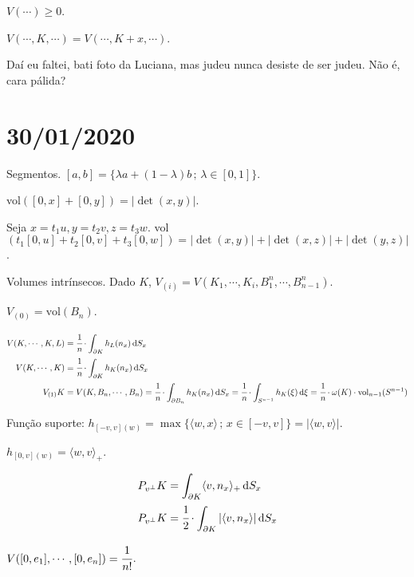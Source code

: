 \documentclass[12pt]{article}
\begin{document}
$V(\cdots) \ge 0$.

$V(\cdots, K, \cdots) = V(\cdots, K + x, \cdots)$.

Da\'i eu faltei, bati foto da Luciana, mas judeu nunca desiste de ser judeu. N\~ao \'e, cara p\'alida?

\vspace{100mm}

\section{30/01/2020}

\begin{flushright}
\end{flushright}

Segmentos. $[a, b] = \{ \lambda a + (1 - \lambda) b\,;\,\lambda \in [0,1] \}$.

vol$([0, x] + [0, y]) = | \det(x, y)|$.

Seja $x = t_1u, y = t_2v, z = t_3w$. vol$(t_1 [0, u] + t_2 [0, v] + t_3 [0, w]) = | \det(x, y)| + | \det(x, z)| + | \det(y, z)|$.

Volumes intr\'insecos. Dado $K$, $V_{(i)} = V(K_1, \cdots, K_i, B_1^n, \cdots, B_{n-1}^n)$.

$V_{(0)} = \text{vol}(B_n)$.

\begin{align}
V(K, \cdots, K, L) &= \cfrac{1}{n}\cdot \int_{\partial K} h_L(n_x)\,\mathrm{d}S_x \\
V(K, \cdots, K) &= \cfrac{1}{n}\cdot \int_{\partial K} h_K(n_x)\,\mathrm{d}S_x \\
V_{(1)}K &= V(K, B_n, \cdots, B_n) = \cfrac{1}{n}\cdot \int_{\partial B_n} h_K(n_x)\,\mathrm{d}S_x = \cfrac{1}{n}\cdot \int_{S^{n - 1}} h_K(\xi)\,\mathrm{d}\xi = \cfrac{1}{n}\cdot \omega(K)\cdot \text{vol}_{n - 1}(S^{n - 1})
\end{align}

Fun\c{c}\~ao suporte: $h_{[-v,v](w)} = \max \{ \langle w, x \rangle\,;\,x \in [-v,v] \} = |\langle w, v \rangle|$.

$h_{[0,v](w)} = \langle w, v \rangle_+$.

\begin{align}
P_{v^\perp}K &= \int_{\partial K} \langle v, n_x \rangle_+\,\mathrm{d}S_x \\
P_{v^\perp}K &= \cfrac{1}{2}\cdot \int_{\partial K} \vert\langle v, n_x \rangle\vert\,\mathrm{d}S_x
\end{align}

$V([0, e_1], \cdots, [0, e_n]) = \cfrac{1}{n!}$.
\end{document}
